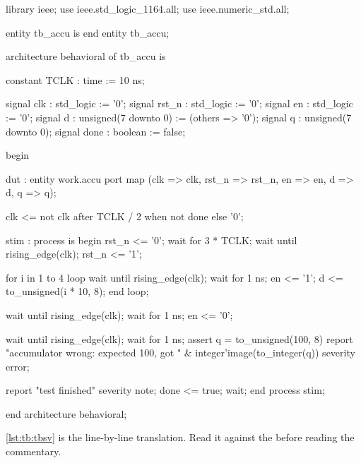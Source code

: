 \begin{vhdlcode}[caption={A conventional \VHDL{} testbench},label={lst:tb:tbvhdl}]
library ieee;
use ieee.std_logic_1164.all;
use ieee.numeric_std.all;

entity tb_accu is
end entity tb_accu;

architecture behavioral of tb_accu is

  constant TCLK : time := 10 ns;

  signal clk   : std_logic := '0';
  signal rst_n : std_logic := '0';
  signal en    : std_logic := '0';
  signal d     : unsigned(7 downto 0) := (others => '0');
  signal q     : unsigned(7 downto 0);
  signal done  : boolean := false;

begin

  dut : entity work.accu
    port map (clk => clk, rst_n => rst_n, en => en,
              d => d, q => q);

  clk <= not clk after TCLK / 2 when not done else '0';

  stim : process is
  begin
    rst_n <= '0';
    wait for 3 * TCLK;
    wait until rising_edge(clk);
    rst_n <= '1';

    for i in 1 to 4 loop
      wait until rising_edge(clk);
      wait for 1 ns;
      en <= '1';
      d  <= to_unsigned(i * 10, 8);
    end loop;

    wait until rising_edge(clk);
    wait for 1 ns;
    en <= '0';

    wait until rising_edge(clk);
    wait for 1 ns;
    assert q = to_unsigned(100, 8)
      report "accumulator wrong: expected 100, got "
             & integer'image(to_integer(q))
      severity error;

    report "test finished" severity note;
    done <= true;
    wait;
  end process stim;

end architecture behavioral;
\end{vhdlcode}

\cref{lst:tb:tbsv} is the line-by-line \SV{} translation. Read it against the
\VHDL{} before reading the commentary.

